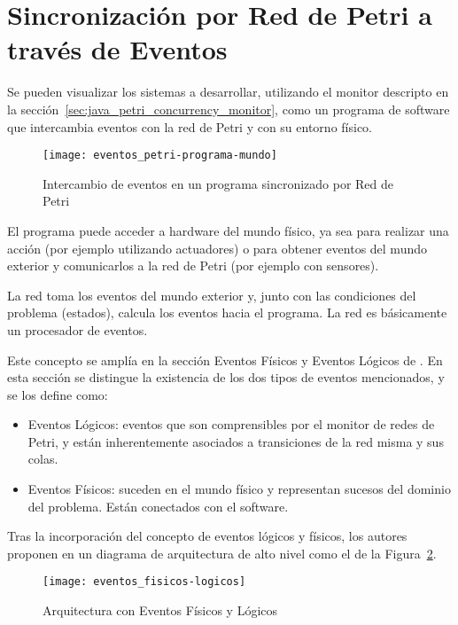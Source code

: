 \section{Sincronización por Red de Petri a través de Eventos}
\label{sec:sincronizacion_RdP_por_eventos}
Se pueden visualizar los sistemas a desarrollar, utilizando el monitor
descripto en la sección~\ref{sec:java_petri_concurrency_monitor}, como un programa de
software que intercambia eventos con la red de Petri y con su entorno físico.

\begin{figure}[h]
	\centering
	\texttt{[image: eventos\_petri-programa-mundo]}
	\caption{Intercambio de eventos en un programa sincronizado por Red de Petri}
	\label{fig:eventos_petri-programa-mundo}
\end{figure}

El programa puede acceder a hardware del mundo físico, ya sea para realizar una
acción (por ejemplo utilizando actuadores) o  para obtener eventos del mundo
exterior y comunicarlos a la red de Petri (por ejemplo con sensores).

La red toma los eventos del mundo exterior y, junto con las condiciones del
problema (estados), calcula los eventos hacia el programa.
La red es básicamente un procesador de eventos. \cite{TesisMicolini}\cite{chimp}

Este concepto se amplía en la sección Eventos Físicos y Eventos
Lógicos de \cite{chimp}. En esta sección se distingue la existencia de los dos
tipos de eventos mencionados, y se los define como:
  \begin{itemize}
    \item Eventos Lógicos: eventos que son comprensibles por el monitor de
    redes de Petri, y están inherentemente asociados a transiciones de la red
    misma y sus colas.
    \item Eventos Físicos: suceden en el mundo físico y representan sucesos del
    dominio del problema. Están conectados con el software.
  \end{itemize}

Tras la incorporación del concepto de eventos lógicos y físicos, los autores
proponen en \cite{chimp} un diagrama de arquitectura de alto nivel como el de
la Figura~\ref{fig:eventos_fisicos-logicos}.

\begin{figure}[h]
	\centering
	\texttt{[image: eventos\_fisicos-logicos]}
	\caption{Arquitectura con Eventos Físicos y Lógicos}
	\label{fig:eventos_fisicos-logicos}
\end{figure}

